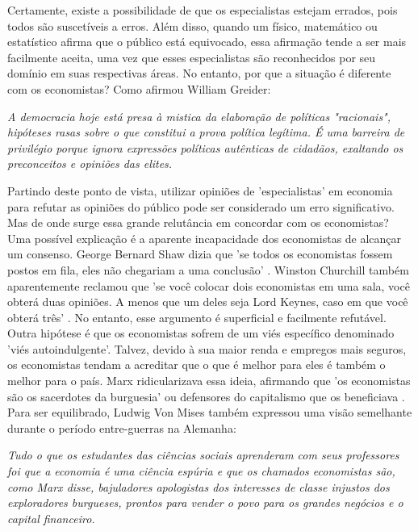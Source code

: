 Certamente, existe a possibilidade de que os especialistas estejam errados, pois todos são suscetíveis a erros. Além disso, quando um físico, matemático ou estatístico afirma que o público está equivocado, essa afirmação tende a ser mais facilmente aceita, uma vez que esses especialistas são reconhecidos por seu domínio em suas respectivas áreas. No entanto, por que a situação é diferente com os economistas? Como afirmou William Greider:

\begin{citacao}
    \textit{
        A democracia hoje está presa à mistica da elaboração de políticas "racionais", hipóteses rasas sobre o que constitui a prova política legítima. É uma barreira de privilégio porque ignora expressões políticas autênticas de cidadãos, exaltando os preconceitos e opiniões das elites.
    } \newline
    \cite{greider2010will}

\end{citacao}

Partindo deste ponto de vista, utilizar opiniões de 'especialistas' em economia para refutar as opiniões do público pode ser considerado um erro significativo. Mas de onde surge essa grande relutância em concordar com os economistas? Uma possível explicação é a aparente incapacidade dos economistas de alcançar um consenso. George Bernard Shaw dizia que 'se todos os economistas fossem postos em fila, eles não chegariam a uma conclusão' \cite{sec_alligators_2021}. Winston Churchill também aparentemente reclamou que 'se você colocar dois economistas em uma sala, você obterá duas opiniões. A menos que um deles seja Lord Keynes, caso em que você obterá três' \cite{steelman_why_2016}. No entanto, esse argumento é superficial e facilmente refutável. Outra hipótese é que os economistas sofrem de um viés específico denominado 'viés autoindulgente'. Talvez, devido à sua maior renda e empregos mais seguros, os economistas tendam a acreditar que o que é melhor para eles é também o melhor para o país. Marx ridicularizava essa ideia, afirmando que 'os economistas são os sacerdotes da burguesia' ou defensores do capitalismo que os beneficiava \cite{marx_engels_capital}. Para ser equilibrado, Ludwig Von Mises também expressou uma visão semelhante durante o período entre-guerras na Alemanha:

\begin{citacao}
    \textit{
        Tudo o que os estudantes das ciências sociais aprenderam com seus professores foi que a economia é uma ciência espúria e que os chamados economistas são, como Marx disse, bajuladores apologistas dos interesses de classe injustos dos exploradores burgueses, prontos para vender o povo para os grandes negócios e o capital financeiro.
    } \newline
    \cite{mises_bureaucracy}

\end{citacao}

